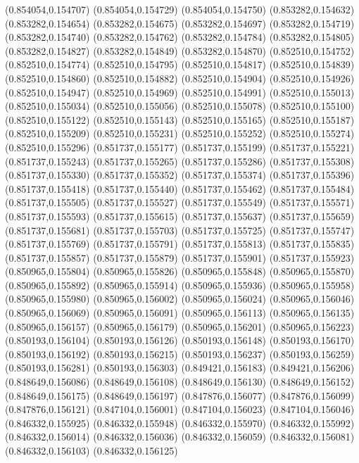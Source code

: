 (0.854054,0.154707)
(0.854054,0.154729)
(0.854054,0.154750)
(0.853282,0.154632)
(0.853282,0.154654)
(0.853282,0.154675)
(0.853282,0.154697)
(0.853282,0.154719)
(0.853282,0.154740)
(0.853282,0.154762)
(0.853282,0.154784)
(0.853282,0.154805)
(0.853282,0.154827)
(0.853282,0.154849)
(0.853282,0.154870)
(0.852510,0.154752)
(0.852510,0.154774)
(0.852510,0.154795)
(0.852510,0.154817)
(0.852510,0.154839)
(0.852510,0.154860)
(0.852510,0.154882)
(0.852510,0.154904)
(0.852510,0.154926)
(0.852510,0.154947)
(0.852510,0.154969)
(0.852510,0.154991)
(0.852510,0.155013)
(0.852510,0.155034)
(0.852510,0.155056)
(0.852510,0.155078)
(0.852510,0.155100)
(0.852510,0.155122)
(0.852510,0.155143)
(0.852510,0.155165)
(0.852510,0.155187)
(0.852510,0.155209)
(0.852510,0.155231)
(0.852510,0.155252)
(0.852510,0.155274)
(0.852510,0.155296)
(0.851737,0.155177)
(0.851737,0.155199)
(0.851737,0.155221)
(0.851737,0.155243)
(0.851737,0.155265)
(0.851737,0.155286)
(0.851737,0.155308)
(0.851737,0.155330)
(0.851737,0.155352)
(0.851737,0.155374)
(0.851737,0.155396)
(0.851737,0.155418)
(0.851737,0.155440)
(0.851737,0.155462)
(0.851737,0.155484)
(0.851737,0.155505)
(0.851737,0.155527)
(0.851737,0.155549)
(0.851737,0.155571)
(0.851737,0.155593)
(0.851737,0.155615)
(0.851737,0.155637)
(0.851737,0.155659)
(0.851737,0.155681)
(0.851737,0.155703)
(0.851737,0.155725)
(0.851737,0.155747)
(0.851737,0.155769)
(0.851737,0.155791)
(0.851737,0.155813)
(0.851737,0.155835)
(0.851737,0.155857)
(0.851737,0.155879)
(0.851737,0.155901)
(0.851737,0.155923)
(0.850965,0.155804)
(0.850965,0.155826)
(0.850965,0.155848)
(0.850965,0.155870)
(0.850965,0.155892)
(0.850965,0.155914)
(0.850965,0.155936)
(0.850965,0.155958)
(0.850965,0.155980)
(0.850965,0.156002)
(0.850965,0.156024)
(0.850965,0.156046)
(0.850965,0.156069)
(0.850965,0.156091)
(0.850965,0.156113)
(0.850965,0.156135)
(0.850965,0.156157)
(0.850965,0.156179)
(0.850965,0.156201)
(0.850965,0.156223)
(0.850193,0.156104)
(0.850193,0.156126)
(0.850193,0.156148)
(0.850193,0.156170)
(0.850193,0.156192)
(0.850193,0.156215)
(0.850193,0.156237)
(0.850193,0.156259)
(0.850193,0.156281)
(0.850193,0.156303)
(0.849421,0.156183)
(0.849421,0.156206)
(0.848649,0.156086)
(0.848649,0.156108)
(0.848649,0.156130)
(0.848649,0.156152)
(0.848649,0.156175)
(0.848649,0.156197)
(0.847876,0.156077)
(0.847876,0.156099)
(0.847876,0.156121)
(0.847104,0.156001)
(0.847104,0.156023)
(0.847104,0.156046)
(0.846332,0.155925)
(0.846332,0.155948)
(0.846332,0.155970)
(0.846332,0.155992)
(0.846332,0.156014)
(0.846332,0.156036)
(0.846332,0.156059)
(0.846332,0.156081)
(0.846332,0.156103)
(0.846332,0.156125)
